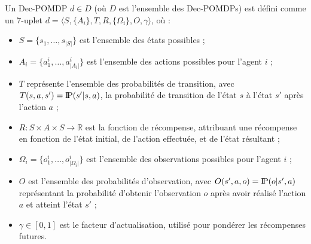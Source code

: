 \documentclass[pdflatex,sn-mathphys-num]{sn-jnl}%
\newcommand{\probP}{\text{I\kern-0.15em P}}
\theoremstyle{thmstyleone}%
\theoremstyle{thmstyletwo}%
\theoremstyle{thmstylethree}%
\begin{document}
Un Dec-POMDP $d \in D$ (où $D$ est l’ensemble des Dec-POMDPs) est défini comme un 7-uplet $d = \langle S, \{A_i\}, T, R, \{\Omega_i\}, O, \gamma \rangle$, où :
\begin{itemize}
    \item $S = \{s_1,\dots,s_{|S|}\}$ est l’ensemble des états possibles ;
    \item $A_{i} = \{a_{1}^{i},\dots,a_{|A_{i}|}^{i}\}$ est l’ensemble des actions possibles pour l’agent $i$ ;
    \item $T$ représente l’ensemble des probabilités de transition, avec $T(s,a,s') = \probP(s'|s,a)$, la probabilité de transition de l’état $s$ à l’état $s'$ après l’action $a$ ;
    \item $R: S \times A \times S \rightarrow \mathbb{R}$ est la fonction de récompense, attribuant une récompense en fonction de l’état initial, de l’action effectuée, et de l’état résultant ;
    \item $\Omega_{i} = \{o_{1}^{i},\dots,o_{|\Omega_{i}|}^{i}\}$ est l’ensemble des observations possibles pour l’agent $i$ ;
    \item $O$ est l’ensemble des probabilités d’observation, avec $O(s',a,o) = \probP(o|s',a)$ représentant la probabilité d’obtenir l’observation $o$ après avoir réalisé l’action $a$ et atteint l’état $s'$ ;
    \item $\gamma \in [0,1]$ est le facteur d’actualisation, utilisé pour pondérer les récompenses futures.
\end{itemize}
\end{document}
